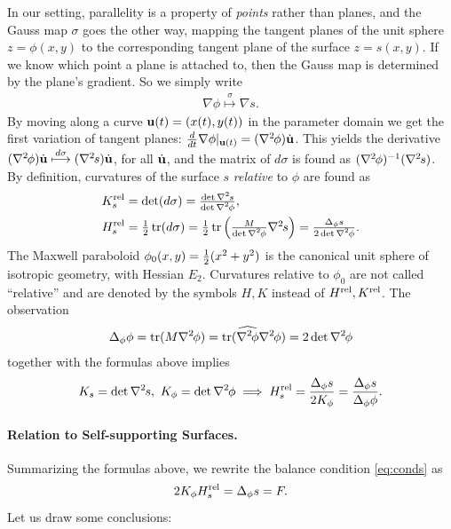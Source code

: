\documentclass[annual]{acmsiggraph}
\def\wh{\widehat}
\def\tr{\mathop{{\rm tr}}\nolimits}
\def\rel{{\mathord{{\rm rel}}}}
\def\ess{s}
\def\Hess#1{{\def\testess{#1}\nabla^2\ifx\testess\ess\!s\else #1\fi}}
\def\Hess#1{\text{$\nabla^2\hskip-.2ex #1$}}
\begin{document}
In our setting, parallelity is a property of {\em points} rather than
planes, and the Gauss map $\sigma$ goes the other way, mapping the tangent
planes of the unit sphere $z=\phi(x,y)$ to the corresponding tangent plane
of the surface $z=s(x,y)$. If we know which point a plane is attached to,
then the Gauss map is determined by the plane's gradient. So we simply write
	\begin{align*}
	\nabla \phi\overset\sigma\longmapsto\nabla s.
	\end{align*}
 By moving along a curve ${\mathbf u}(t)=(x(t),y(t))$ in the parameter domain we
get the first variation of tangent planes:
	$
	{d\over dt}\nabla \phi|_{\uw(t)} =
	(\Hess\phi)\dot\uw
	$.
 This yields the derivative
	$	
	(\Hess\phi)\dot\uw \overset{d\sigma}\longmapsto
	(\Hess s)\dot\uw $,
 for all $\dot{{\mathbf u}}$, and the matrix of $d\sigma$ is found as
$(\Hess\phi)^{-1}(\Hess s)$.  By definition, curvatures of the surface $s$
{\em relative} to $\phi$ are found as
	\begin{align*}
		K_s^\rel
	& = \textstyle
		\det(d\sigma) =
		{\det\Hess s \over \det\Hess\phi} ,
	\\
		H_s^\rel
	&= \textstyle
		{1\over 2}\tr(d\sigma)
		= {1\over 2}\tr \left({M\over\det\Hess\phi} \Hess s\right)
		=  {\Delta_\phi s \over 2\det\Hess\phi}.
	\end{align*}
 The Maxwell paraboloid $\phi_0(x,y)={1\over 2}(x^2+y^2)$ is the canonical
unit sphere of isotropic geometry, with Hessian $E_2$. Curvatures
relative to $\phi_0$ are not called ``relative'' and are denoted by the
symbols $H,K$ instead of $H^\rel,K^\rel$. The observation
	\begin{align*}
	\Delta_\phi \phi
	= \tr(M \Hess \phi)
	= \tr(\wh{\Hess\phi}\Hess\phi)
	= 2\det\Hess\phi
	\end{align*}
 together with the formulas above implies
	\begin{align*}
		K_s  = \det \Hess s,
	\
		K_\phi = \det \Hess \phi
	\implies
		H_s^\rel =  {\Delta_\phi s \over 2 K_\phi}
			= {\Delta_\phi s\over \Delta_\phi \phi}.
	\end{align*}

\paragraph{Relation to Self-supporting Surfaces.}

Summarizing the formulas above,
we rewrite the balance condition \eqref{eq:conds} as
	\begin{equation}
	2 K_\phi H_s^\rel  = \Delta_\phi s = F.
	\label{equigeo}
	\end{equation}
 Let us draw some conclusions:
\end{document}
